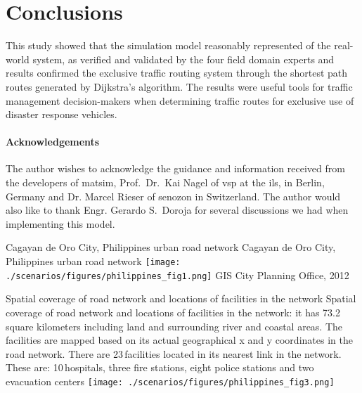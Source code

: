 \section{Conclusions}
This study showed that the simulation model reasonably represented of the real-world system, as verified and validated by the four field domain experts and results confirmed the exclusive traffic routing system through the shortest path routes generated by Dijkstra’s algorithm. The results were useful tools for traffic management decision-makers when determining traffic routes for exclusive use of disaster response vehicles.

\paragraph{Acknowledgements}
The author wishes to acknowledge the guidance and information received from the developers of \gls{matsim}, Prof.\ Dr.\ Kai Nagel of \gls{vsp} at the \gls{ils}, in Berlin, Germany and Dr. Marcel Rieser of \gls{senozon} in Switzerland. The author would also like to thank Engr. Gerardo S.\ Doroja for several discussions we had when implementing this model.

\createfigure%
{Cagayan de Oro City, Philippines urban road network}%
{Cagayan de Oro City, Philippines urban road network}%
{\label{fig:philippines_fig1}}%
{\texttt{[image: ./scenarios/figures/philippines\_fig1.png]}}%
{GIS City Planning Office, 2012}

\createfigure%
{Spatial coverage of road network and locations of facilities in the network}%
{Spatial coverage of road network and locations of facilities in the network: it has 73.2\,square kilometers including land and surrounding river and coastal areas. The facilities are mapped based on its actual geographical x and y coordinates in the road network. There are 23\,facilities located in its nearest link in the network. These are: 10\,hospitals, three fire stations, eight police stations and two evacuation centers}%
{\label{fig:philippines_fig3}}%
{\texttt{[image: ./scenarios/figures/philippines\_fig3.png]}}%
{}

